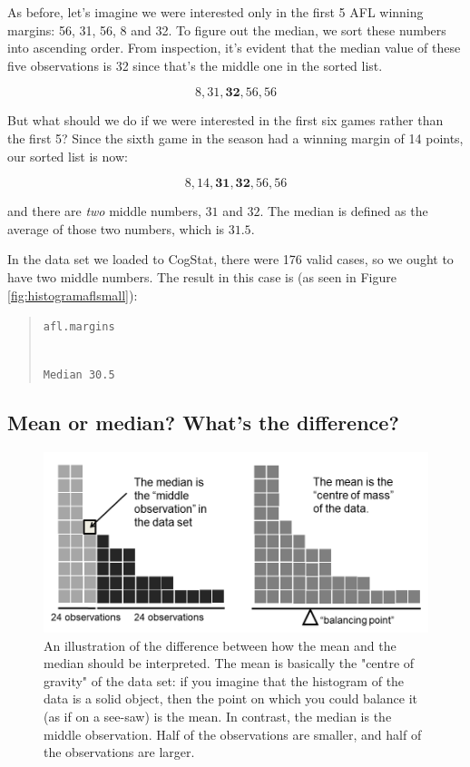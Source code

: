 \documentclass[
  11pt,
  a4paper,
  twoside,symmetric,openright]{book}
\theoremstyle{break}
\theoremstyle{break}
\begin{document}
\begin{example}[Median]
\protect\hypertarget{exm:exmedian}{}\label{exm:exmedian}As before, let's imagine we were interested only in the first 5 AFL winning margins: 56, 31, 56, 8 and 32. To figure out the median, we sort these numbers into ascending order. From inspection, it's evident that the median value of these five observations is 32 since that's the middle one in the sorted list.

\[
8, 31, \mathbf{32}, 56, 56
\]

But what should we do if we were interested in the first six games rather than the first 5? Since the sixth game in the season had a winning margin of 14 points, our sorted list is now:

\[
8, 14, \mathbf{31}, \mathbf{32}, 56, 56
\]

and there are \emph{two} middle numbers, \(31\) and \(32\). The median is defined as the average of those two numbers, which is \(31.5\).
\end{example}

In the data set we loaded to CogStat, there were 176 valid cases, so we ought to have two middle numbers. The result in this case is (as seen in Figure \ref{fig:histogramaflsmall}):

\begin{quote}
\texttt{afl.margins}\strut \\
\texttt{Median\ 30.5}
\end{quote}

\hypertarget{mean-or-median-whats-the-difference}{%
\subsection{Mean or median? What's the difference?}\label{mean-or-median-whats-the-difference}}

\begin{figure}

{\centering \includegraphics[width=0.6\linewidth]{./resources/image/meanmedian} 

}

\caption[An illustration of the difference between how the mean and the median should be interpreted.]{An illustration of the difference between how the mean and the median should be interpreted. The mean is basically the "centre of gravity" of the data set: if you imagine that the histogram of the data is a solid object, then the point on which you could balance it (as if on a see-saw) is the mean. In contrast, the median is the middle observation. Half of the observations are smaller, and half of the observations are larger.}\label{fig:meanmedian}
\end{figure}
\end{document}
